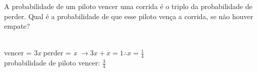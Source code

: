 \begin{ex}
A probabilidade de um piloto vencer uma corrida é o triplo da probabilidade de perder. Qual é a probabilidade de que esse piloto vença a corrida, se não  houver empate?
  \begin{sol}
    \phantom{A} \\
 vencer = 3\textit{x} \hspace{0,3cm} perder = \textit{x}\hspace{0,3cm} $\rightarrow 3x+x=1 \therefore x=\frac{1}{4}$ \\
  probabilidade de piloto vencer: $\frac{3}{4}$
  \end{sol}
\end{ex}